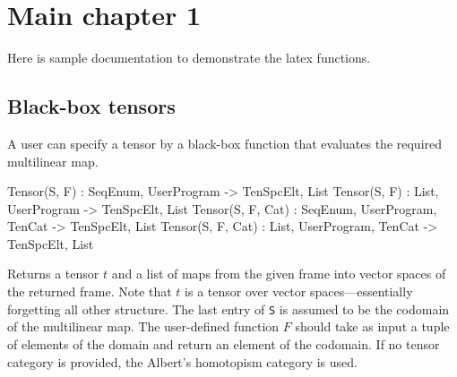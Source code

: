 \documentclass{documentation}
\begin{document}
\chapter{Main chapter 1}


Here is sample documentation to demonstrate the latex functions.


\section{Black-box tensors}
A user can specify a tensor by a black-box function that evaluates the required
multilinear map.

\begin{intrinsics}
Tensor(S, F) : SeqEnum, UserProgram -> TenSpcElt, List
Tensor(S, F) : List, UserProgram -> TenSpcElt, List
Tensor(S, F, Cat) : SeqEnum, UserProgram, TenCat -> TenSpcElt, List
Tensor(S, F, Cat) : List, UserProgram, TenCat -> TenSpcElt, List
\end{intrinsics}

Returns a tensor $t$ and a list of maps from the given frame into vector spaces of the returned frame.
Note that $t$ is a tensor over vector spaces---essentially forgetting all other structure.
The last entry of \texttt{S} is assumed to be the codomain of the multilinear map. 
The user-defined function $F$ should take as input a tuple of elements of the domain and return an element of the codomain.
If no tensor category is provided, the Albert's homotopism category is used.
\end{document}
